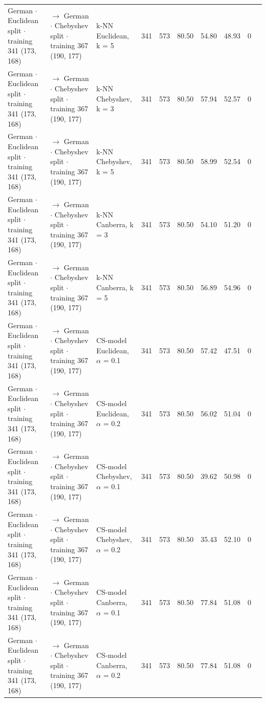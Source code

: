 \begin{table}[htbp]
\begin{tabular}{lllrrrrrrl}
    German $\cdot$ Euclidean split $\cdot$ training 341 (173, 168) & $\to$ German $\cdot$ Chebyshev split $\cdot$ training 367 (190, 177) & k-NN Euclidean, k = 5 & 341 & 573 & 80.50 & 54.80 & 48.93 & 0 &  \\
    German $\cdot$ Euclidean split $\cdot$ training 341 (173, 168) & $\to$ German $\cdot$ Chebyshev split $\cdot$ training 367 (190, 177) & k-NN Chebyshev, k = 3 & 341 & 573 & 80.50 & 57.94 & 52.57 & 0 &  \\
    German $\cdot$ Euclidean split $\cdot$ training 341 (173, 168) & $\to$ German $\cdot$ Chebyshev split $\cdot$ training 367 (190, 177) & k-NN Chebyshev, k = 5 & 341 & 573 & 80.50 & 58.99 & 52.54 & 0 &  \\
    German $\cdot$ Euclidean split $\cdot$ training 341 (173, 168) & $\to$ German $\cdot$ Chebyshev split $\cdot$ training 367 (190, 177) & k-NN Canberra, k = 3 & 341 & 573 & 80.50 & 54.10 & 51.20 & 0 &  \\
    German $\cdot$ Euclidean split $\cdot$ training 341 (173, 168) & $\to$ German $\cdot$ Chebyshev split $\cdot$ training 367 (190, 177) & k-NN Canberra, k = 5 & 341 & 573 & 80.50 & 56.89 & 54.96 & 0 &  \\
    German $\cdot$ Euclidean split $\cdot$ training 341 (173, 168) & $\to$ German $\cdot$ Chebyshev split $\cdot$ training 367 (190, 177) & CS-model Euclidean, $\alpha$ = 0.1 & 341 & 573 & 80.50 & 57.42 & 47.51 & 0 &  \\
    German $\cdot$ Euclidean split $\cdot$ training 341 (173, 168) & $\to$ German $\cdot$ Chebyshev split $\cdot$ training 367 (190, 177) & CS-model Euclidean, $\alpha$ = 0.2 & 341 & 573 & 80.50 & 56.02 & 51.04 & 0 &  \\
    German $\cdot$ Euclidean split $\cdot$ training 341 (173, 168) & $\to$ German $\cdot$ Chebyshev split $\cdot$ training 367 (190, 177) & CS-model Chebyshev, $\alpha$ = 0.1 & 341 & 573 & 80.50 & 39.62 & 50.98 & 0 &  \\
    German $\cdot$ Euclidean split $\cdot$ training 341 (173, 168) & $\to$ German $\cdot$ Chebyshev split $\cdot$ training 367 (190, 177) & CS-model Chebyshev, $\alpha$ = 0.2 & 341 & 573 & 80.50 & 35.43 & 52.10 & 0 &  \\
    German $\cdot$ Euclidean split $\cdot$ training 341 (173, 168) & $\to$ German $\cdot$ Chebyshev split $\cdot$ training 367 (190, 177) & CS-model Canberra, $\alpha$ = 0.1 & 341 & 573 & 80.50 & 77.84 & 51.08 & 0 &  \\
    German $\cdot$ Euclidean split $\cdot$ training 341 (173, 168) & $\to$ German $\cdot$ Chebyshev split $\cdot$ training 367 (190, 177) & CS-model Canberra, $\alpha$ = 0.2 & 341 & 573 & 80.50 & 77.84 & 51.08 & 0 &  \\

\end{tabular}
\end{table}
